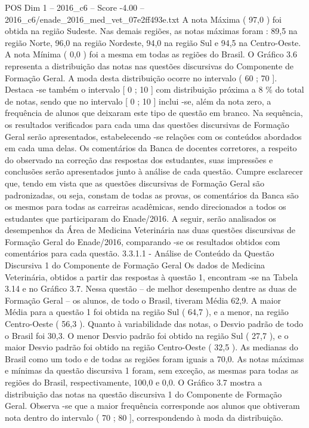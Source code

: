 \begin{textsample}{POS Dim 1 – 2016\_c6 – Score -4.00 – 2016\_c6/enade\_2016\_med\_vet\_07e2ff493e.txt}
A nota Máxima ( 97,0 ) foi obtida na região Sudeste.
Nas demais regiões, as notas máximas foram : 89,5 na região Norte, 96,0 na região Nordeste, 94,0 na região Sul e 94,5 na Centro-Oeste.
A nota Mínima ( 0,0 ) foi a mesma em todas as regiões do Brasil.
O Gráfico 3.6 representa a distribuição das notas nas questões discursivas do Componente de Formação Geral.
A moda desta distribuição ocorre no intervalo ( 60 ; 70 ].
Destaca -se também o intervalo [ 0 ; 10 ] com distribuição próxima a 8 \% do total de notas, sendo que no intervalo [ 0 ; 10 ] inclui -se, além da nota zero, a frequência de alunos que deixaram este tipo de questão em branco.
Na sequência, os resultados verificados para cada uma das questões discursivas de Formação Geral serão apresentados, estabelecendo -se relações com os conteúdos abordados em cada uma delas.
Os comentários da Banca de docentes corretores, a respeito do observado na correção das respostas dos estudantes, suas impressões e conclusões serão apresentados junto à análise de cada questão.
Cumpre esclarecer que, tendo em vista que as questões discursivas de Formação Geral são padronizadas, ou seja, constam de todas as provas, os comentários da Banca são os mesmos para todas as carreiras acadêmicas, sendo direcionados a todos os estudantes que participaram do Enade/2016.
A seguir, serão analisados os desempenhos da Área de Medicina Veterinária nas duas questões discursivas de Formação Geral do Enade/2016, comparando -se os resultados obtidos com comentários para cada questão. 3.3.1.1 - Análise de Conteúdo da Questão Discursiva 1 do Componente de Formação Geral Os dados de Medicina Veterinária, obtidos a partir das respostas à questão 1, encontram -se na Tabela 3.14 e no Gráfico 3.7.
Nessa questão – de melhor desempenho dentre as duas de Formação Geral – os alunos, de todo o Brasil, tiveram Média 62,9.
A maior Média para a questão 1 foi obtida na região Sul ( 64,7 ), e a menor, na região Centro-Oeste ( 56,3 ).
Quanto à variabilidade das notas, o Desvio padrão de todo o Brasil foi 30,3.
O menor Desvio padrão foi obtido na região Sul ( 27,7 ), e o maior Desvio padrão foi obtido na região Centro-Oeste ( 32,5 ).
As medianas do Brasil como um todo e de todas as regiões foram iguais a 70,0.
As notas máximas e mínimas da questão discursiva 1 foram, sem exceção, as mesmas para todas as regiões do Brasil, respectivamente, 100,0 e 0,0.
O Gráfico 3.7 mostra a distribuição das notas na questão discursiva 1 do Componente de Formação Geral.
Observa -se que a maior frequência corresponde aos alunos que obtiveram nota dentro do intervalo ( 70 ; 80 ], correspondendo à moda da distribuição.

\end{textsample}
